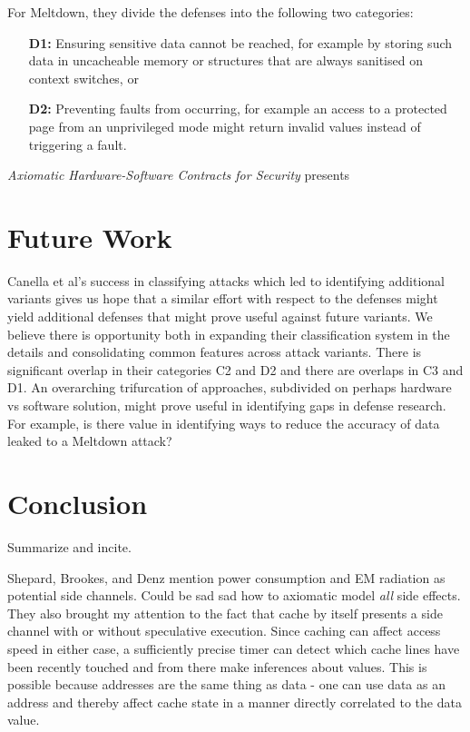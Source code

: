 \documentclass[11pt,conference]{IEEEtran}
\begin{document}
For Meltdown, they divide the defenses into the following two categories:
\begin{enumerate}
	\item[\textbf{D1:}] Ensuring sensitive data cannot be reached, for example by storing such data in uncacheable memory or structures that are always sanitised on context switches, or
	\item[\textbf{D2:}] Preventing faults from occurring, for example an access to a protected page from an unprivileged mode might return invalid values instead of triggering a fault.
\end{enumerate}

\textit{Axiomatic Hardware-Software Contracts for Security} presents 
\cite{mosier2022}

\cite{cats2022}
\section{Future Work}\label{sec:future}

Canella et al's success in classifying attacks which led to identifying additional variants gives us hope that a similar effort with respect to the defenses might yield additional defenses that might prove useful against future variants.
We believe there is opportunity both in expanding their classification system in the details and consolidating common features across attack variants.
There is significant overlap in their categories C2 and D2 and there are overlaps in C3 and D1.
An overarching trifurcation of approaches, subdivided on perhaps hardware vs software solution, might prove useful in identifying gaps in defense research.
For example, is there value in identifying ways to reduce the accuracy of data leaked to a Meltdown attack?

\section{Conclusion}
Summarize and incite.

Shepard, Brookes, and Denz \cite{shepherd2022transient} mention power consumption and EM radiation as potential side channels.
Could be sad sad how to axiomatic model \emph{all} side effects.
They also brought my attention to the fact that cache by itself presents a side channel with or without speculative execution.
Since caching can affect access speed in either case, a sufficiently precise timer can detect which cache lines have been recently touched and from there make inferences about values.
This is possible because addresses are the same thing as data - one can use data as an address and thereby affect cache state in a manner directly correlated to the data value.
\end{document}
